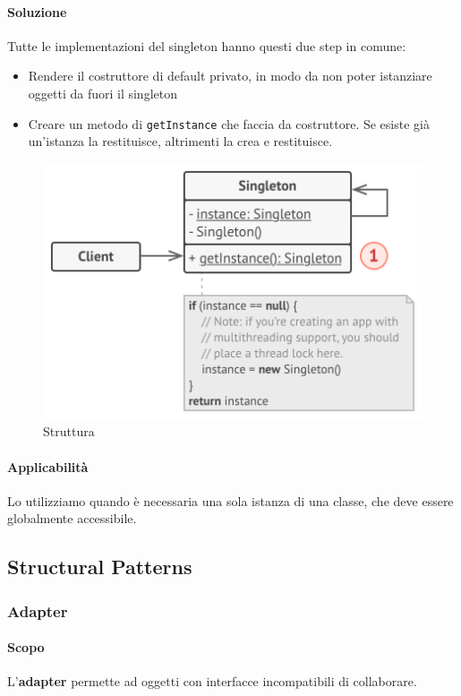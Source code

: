 \documentclass[11pt]{article}
\newcommand{\code}[1]{\texttt{#1}}
\begin{document}
\paragraph{Soluzione}
Tutte le implementazioni del singleton hanno questi due step in comune:
\begin{itemize}
    \item Rendere il costruttore di default privato, in modo da non poter istanziare oggetti da fuori il singleton 
    \item Creare un metodo di \code{getInstance} che faccia da costruttore. Se esiste già un'istanza la restituisce, altrimenti la crea e restituisce.
\end{itemize}
\begin{figure}[H]
    \centering
    \includegraphics[width=\linewidth]{res/teoria/Singleton.png}
    \caption{Struttura}
\end{figure}
\paragraph{Applicabilità}
Lo utilizziamo quando è necessaria una sola istanza di una classe, che deve essere globalmente accessibile. 

\subsection{Structural Patterns}
\subsubsection{Adapter}
\paragraph{Scopo}
L'\textbf{adapter} permette ad oggetti con interfacce incompatibili di collaborare.
\end{document}
